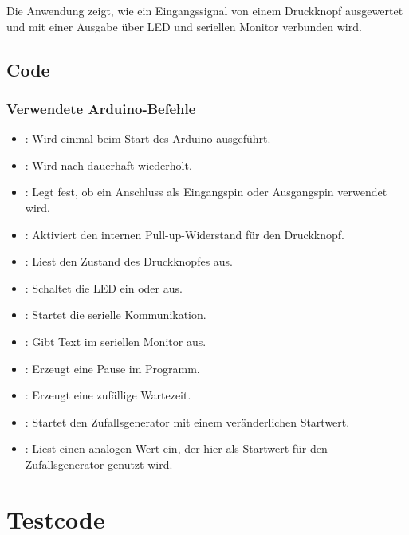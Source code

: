 Die Anwendung zeigt, wie ein Eingangssignal von einem Druckknopf ausgewertet und mit einer Ausgabe über LED und seriellen Monitor verbunden wird.

\subsection{Code}

{
	\label{lst:ReaktionstestDruckknopf}
}
\subsubsection*{Verwendete Arduino-Befehle}

\begin{itemize}
	\item {}: Wird einmal beim Start des Arduino ausgeführt.
	\item {}: Wird nach  dauerhaft wiederholt.
	\item {}: Legt fest, ob ein Anschluss als Eingangspin oder Ausgangspin verwendet wird.
	\item {}: Aktiviert den internen Pull-up-Widerstand für den Druckknopf.
	\item {}: Liest den Zustand des Druckknopfes aus.
	\item {}: Schaltet die LED ein oder aus.
	\item {}: Startet die serielle Kommunikation.
	\item {}: Gibt Text im seriellen Monitor aus.
	\item {}: Erzeugt eine Pause im Programm.
	\item {}: Erzeugt eine zufällige Wartezeit.
	\item {}: Startet den Zufallsgenerator mit einem veränderlichen Startwert.
	\item {}: Liest einen analogen Wert ein, der hier als Startwert für den Zufallsgenerator genutzt wird.
\end{itemize}

\section{Testcode}

